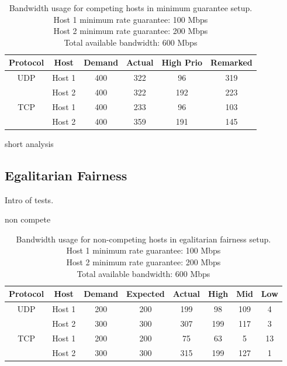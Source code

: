 \documentclass[accepted,single]{gipaper}
\begin{document}
\begin{table}[h]
	\label{mg_c}
	\vspace{-3mm}
	\begin{center}
		\begin{small}
		\setlength\tabcolsep{1.5pt}
			\begin{tabular}{cccccc}
				Protocol & Host & Demand & Actual & High Prio & Remarked \\
				\hline
				UDP & Host 1 & 400 & 322 & 96 & 319\\
				    & Host 2 & 400 & 322 & 192 & 223\\
				\hline
				TCP & Host 1 & 400 & 233 & 96 & 103\\
				    & Host 2 & 400 & 359 & 191 & 145\\
			\end{tabular}
		\end{small}
	\end{center}
	\caption{Bandwidth usage for competing hosts in minimum guarantee setup.\\
	Host 1 minimum rate guarantee: 100 Mbps\\
	Host 2 minimum rate guarantee: 200 Mbps\\	
	Total available bandwidth: 600 Mbps}
	\vspace{-3mm}
\end{table}

short analysis

\subsection{Egalitarian Fairness}
\label{dba_egal}

Intro of tests.

non compete

\begin{table}[h]
	\label{egal_nc}
	\vspace{-3mm}
	\begin{center}
		\begin{small}
		\setlength\tabcolsep{1.5pt}
			\begin{tabular}{cccccccc}
				Protocol & Host & Demand & Expected & Actual & High & Mid & Low\\
				\hline
				UDP & Host 1 & 200 & 200 & 199 & 98 & 109 & 4\\
				    & Host 2 & 300 & 300 & 307 & 199 & 117 & 3\\
				\hline
				TCP & Host 1 & 200 & 200 & 75 & 63 & 5 & 13\\
				    & Host 2 & 300 & 300 & 315 & 199 & 127 & 1\\
			\end{tabular}
		\end{small}
	\end{center}
	\caption{Bandwidth usage for non-competing hosts in egalitarian fairness setup.\\
	Host 1 minimum rate guarantee: 100 Mbps\\
	Host 2 minimum rate guarantee: 200 Mbps\\	
	Total available bandwidth: 600 Mbps}
	\vspace{-3mm}
\end{table}
\end{document}
